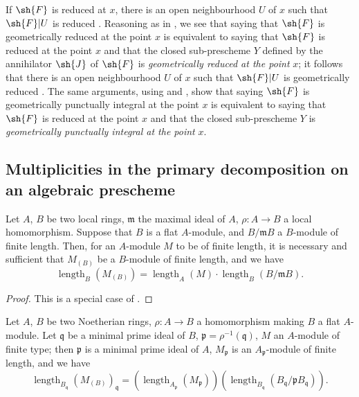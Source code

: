 
If $\sh{F}$ is reduced at $x$, there is an open neighbourhood $U$ of $x$ such that $\sh{F}|U$ is reduced .
Reasoning as in , we see that saying that $\sh{F}$ is geometrically reduced at the point $x$ is equivalent to saying that $\sh{F}$ is reduced at the point $x$ and that the closed sub-prescheme $Y$ defined by the annihilator $\sh{J}$ of $\sh{F}$ is \emph{geometrically reduced at the point} $x$; it follows that there is an open neighbourhood $U$ of $x$ such that $\sh{F}|U$ is geometrically reduced .
The same arguments, using  and , show that saying $\sh{F}$ is geometrically punctually integral at the point $x$ is equivalent to saying that $\sh{F}$ is reduced at the point $x$ and that the closed sub-prescheme $Y$ is \emph{geometrically punctually integral at the point} $x$.


\subsection{Multiplicities in the primary decomposition on an algebraic prescheme}
\label{subsection:IV.4.7}

\begin{lemma}[4.7.1]
\label{IV.4.7.1}
Let $A$, $B$ be two local rings, $\mathfrak{m}$ the maximal ideal of $A$, $\rho:A\to B$ a local homomorphism.
Suppose that $B$ is a flat $A$-module, and $B/\mathfrak{m}B$ a $B$-module of finite length.
Then, for an $A$-module $M$ to be of finite length, it is necessary and sufficient that $M_{(B)}$ be a $B$-module of finite length, and we have
\[
\tag{4.7.1.1}
  \operatorname{length}_B(M_{(B)}) = \operatorname{length}_A(M)\cdot\operatorname{length}_B(B/\mathfrak{m}B).
\]
\end{lemma}

\begin{proof}
This is a special case of .
\end{proof}

\begin{corollary}[4.7.2]
\label{IV.4.7.2}
Let $A$, $B$ be two Noetherian rings, $\rho:A\to B$ a homomorphism making $B$ a flat $A$-module.
Let $\mathfrak{q}$ be a minimal prime ideal of $B$, $\mathfrak{p}=\rho^{-1}(\mathfrak{q})$, $M$ an $A$-module of finite type; then $\mathfrak{p}$ is a minimal prime ideal of $A$, $M_\mathfrak{p}$ is an $A_\mathfrak{p}$-module of finite length, and we have
\[
\tag{4.7.2.1}
  \operatorname{length}_{B_\mathfrak{q}}(M_{(B)})_\mathfrak{q} = (\operatorname{length}_{A_\mathfrak{p}}(M_\mathfrak{p}))(\operatorname{length}_{B_\mathfrak{q}}(B_\mathfrak{q}/\mathfrak{p}B_\mathfrak{q})).
\]
\end{corollary}

